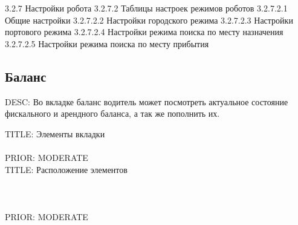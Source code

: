     3.2.7 Настройки робота
    3.2.7.2 Таблицы настроек режимов роботов
    3.2.7.2.1 Общие настройки
    3.2.7.2.2 Настройки городского режима
    3.2.7.2.3 Настройки портового режима
    3.2.7.2.4 Настройки режима поиска по месту назначения
    3.2.7.2.5 Настройки режима поиска по месту прибытия

  \subsection{Баланс}

    DESC: Во вкладке баланс водитель может посмотреть актуальное состояние фискального и арендного баланса, а так же пополнить их. 

      TITLE: Элементы вкладки\\
      \\
      PRIOR: MODERATE\\

      TITLE: Расположение элементов\\
      \\
      \\
      \\
      PRIOR: MODERATE\\

